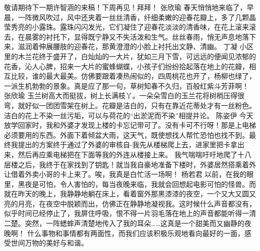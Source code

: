 {}敬请期待下一期许智涵的来稿！下周再见！拜拜！\markdownRendererInterblockSeparator
{}\markdownRendererInterblockSeparator
{}张欣瑜\markdownRendererInterblockSeparator
{}春天悄悄地来临了，早晨，一阵微风吹过，风中还夹着一丝丝清香，纤细柔嫩的迎春花瓣上，多了几颗晶莹秀亮的小露珠。露珠闪闪发光，它们凝住了迎春花淡淡的清香味，在花上滚来滚去，在晨雾的衬托下，显得既宁静又不失活泼和生气。丝丝春雨，悄无声息地落下来，滋润着伸展腰肢的迎春花，那黄澄澄的小脸上衬托出文静、清幽。\markdownRendererInterblockSeparator
{}\markdownRendererInterblockSeparator
{}丁凝\markdownRendererInterblockSeparator
{}小区里的木兰花终于盛开了，白灿灿的一大片，犹如三月下雪，可远远的便闻见浓郁的花香，沁人心脾，招来一大片的蜜蜂蝴蝶，小孩子们纷纷拾起落在地上的花瓣，相互比较，谁的最大最美。仿佛要跟着凑热闹似的，四周桃花也开了，杨柳也绿了，一派生机勃勃的景象。真是应了那一句，草树知春不久归，百般红紫斗芳菲啊！\markdownRendererInterblockSeparator
{}\markdownRendererInterblockSeparator
{}张欣瑜\markdownRendererInterblockSeparator
{}玉兰树高大而挺拔，树上长满枝丫。一朵朵雪白的玉兰花将树梢压得很弯，就好似一团团雪架在树上。花瓣是洁白的，只有在靠近花蒂处才有一丝粉色。洁白的花上不染一丝污垢，可以与荷花的“出淤泥而不染”相提并论。 \markdownRendererInterblockSeparator
{}\markdownRendererInterblockSeparator
{}陈姿伊\markdownRendererInterblockSeparator
{}今天放学回家时，我和外婆才发现上楼的卡忘记带可了。没有卡可不行呀！那是上电梯必须要用的东西。外面下着倾盆大雨，这天气，既使想找人帮忙恐怕也找不到。最终我提出的方案终于通过了外婆的审核自-我先从楼梯爬上去，进家里把卡拿出来，然后再应乘电梯把在下面等我的外连从楼接上来。\markdownRendererInterblockSeparator
{}我气喘喘吁吁地爬了十八层楼之后，我终于在家找到了钥匙！就当我自豪地准备下楼时，外婆居然搭乘着外让借着外卖小哥的卡上来了。唉，我真是白忙活一场啊！\markdownRendererInterblockSeparator
{}\markdownRendererInterblockSeparator
{}杨若君\markdownRendererInterblockSeparator
{}以前，在我的眼里，黑夜是可怕，令人害怕的，每当夜晚来临，我就会回想起电影可怕的怪兽。而就在昨天的晚上，我静静地躺在床上，看着窗外那黑漆漆的夜空，一个又大又圆又亮的月亮，在夜空中脱颖而出，仿佛正在静静地凝视我。这时候什么声音都没有，似乎时间已经停止了，我屏住呼吸，恨不得一片羽毛落在地上的声音都能听得一清二楚。突然，一阵蟋蟀声清楚地传入了我的耳朵……这真是一个甜美而又幽静的夜晚啊！\markdownRendererInterblockSeparator
{}什么事物和事情都有两面性，而我们应该积极乐观地看向最好的一面，感受世间万物的美好与和谐。\markdownRendererInterblockSeparator
